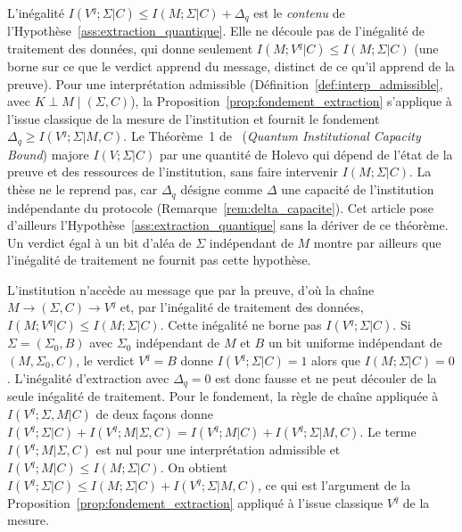 \begin{sloppypar}
\begin{remark}\label{rem:capacite_institutionnelle_quantique}
L'in\'egalit\'e
$I(V^q; \Sigma|C) \leq I(M; \Sigma|C) + \Delta_q$
est le \emph{contenu} de l'Hypoth\`ese~\ref{ass:extraction_quantique}.
Elle ne d\'ecoule pas de l'in\'egalit\'e de traitement des donn\'ees, qui
donne seulement $I(M;V^q|C) \leq I(M;\Sigma|C)$ (une borne sur ce que le verdict
apprend du message, distinct de ce qu'il apprend de la preuve). Pour une interpr\'etation
admissible (D\'efinition~\ref{def:interp_admissible}, avec
$K \perp M \mid (\Sigma, C)$), la Proposition~\ref{prop:fondement_extraction}
s'applique \`a l'issue classique de la mesure de l'institution et fournit le
fondement $\Delta_q \geq I(V^q;\Sigma|M,C)$. Le Th\'eor\`eme~1 de~\cite{MINKA2026PQCRO}
(\emph{Quantum Institutional Capacity Bound}) majore $I(V;\Sigma|C)$ par une quantit\'e de
Holevo qui d\'epend de l'\'etat de la preuve et des ressources de l'institution, sans faire
intervenir $I(M;\Sigma|C)$. La th\`ese ne le reprend pas, car $\Delta_q$ d\'esigne comme
$\Delta$ une capacit\'e de l'institution ind\'ependante du protocole
(Remarque~\ref{rem:delta_capacite}). Cet article pose d'ailleurs
l'Hypoth\`ese~\ref{ass:extraction_quantique} sans la d\'eriver de ce th\'eor\`eme. Un verdict
\'egal \`a un bit d'al\'ea de $\Sigma$ ind\'ependant de $M$ montre par ailleurs que l'in\'egalit\'e
de traitement ne fournit pas cette hypoth\`ese.
\end{remark}

\begin{Preuve}
L'institution n'acc\`ede au message que par la preuve, d'o\`u la cha\^ine
$M \to (\Sigma,C) \to V^q$ et, par l'in\'egalit\'e de traitement des donn\'ees,
$I(M;V^q|C) \leq I(M;\Sigma|C)$. Cette in\'egalit\'e ne borne pas
$I(V^q;\Sigma|C)$. Si $\Sigma = (\Sigma_0, B)$ avec $\Sigma_0$ ind\'ependant de $M$
et $B$ un bit uniforme ind\'ependant de $(M,\Sigma_0,C)$, le verdict $V^q = B$
donne $I(V^q;\Sigma|C) = 1$ alors que $I(M;\Sigma|C) = 0$. L'in\'egalit\'e
d'extraction avec $\Delta_q = 0$ est donc fausse et ne peut d\'ecouler de la
seule in\'egalit\'e de traitement. Pour le fondement, la r\`egle de cha\^ine
appliqu\'ee \`a $I(V^q;\Sigma,M|C)$ de deux fa\c{c}ons donne
$I(V^q;\Sigma|C) + I(V^q;M|\Sigma,C) = I(V^q;M|C) + I(V^q;\Sigma|M,C)$. Le terme
$I(V^q;M|\Sigma,C)$ est nul pour une interpr\'etation admissible et
$I(V^q;M|C) \leq I(M;\Sigma|C)$. On obtient
$I(V^q;\Sigma|C) \leq I(M;\Sigma|C) + I(V^q;\Sigma|M,C)$, ce qui est l'argument de
la Proposition~\ref{prop:fondement_extraction} appliqu\'e \`a l'issue classique
$V^q$ de la mesure.
\end{Preuve}
\end{sloppypar}

